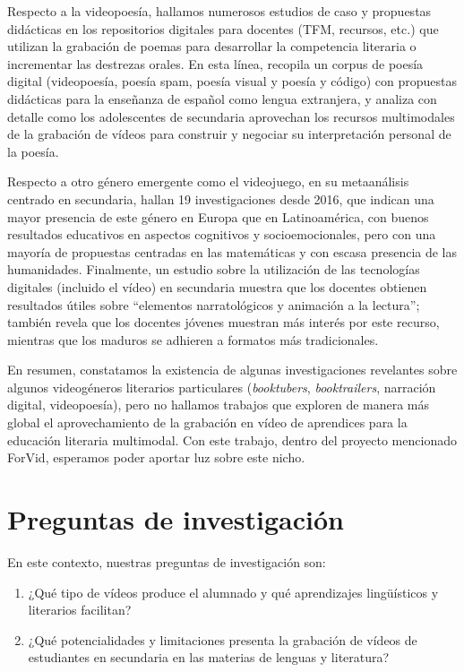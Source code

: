 \documentclass[spanish]{textolivre}
\begin{document}
Respecto a la videopoesía, hallamos numerosos estudios de caso y propuestas didácticas en los repositorios digitales para docentes (TFM, recursos, etc.) que utilizan la grabación de poemas para desarrollar la competencia literaria o incrementar las destrezas orales. En esta línea, \textcite{de_la_torre_literatura_2022} recopila un corpus de poesía digital (videopoesía, poesía spam, poesía visual y poesía y código) con propuestas didácticas para la enseñanza de español como lengua extranjera, y \textcite{hoglund_video_2017} analiza con detalle como los adolescentes de secundaria aprovechan los recursos multimodales de la grabación de vídeos para construir y negociar su interpretación personal de la poesía.

Respecto a otro género emergente como el videojuego, en su metaanálisis centrado en secundaria, \textcite{rojas-garcia_alisis_2022} hallan 19 investigaciones desde 2016, que indican una mayor presencia de este género en Europa que en Latinoamérica, con buenos resultados educativos en aspectos cognitivos y socioemocionales, pero con una mayoría de propuestas centradas en las matemáticas y con escasa presencia de las humanidades. Finalmente, un estudio sobre la utilización de las tecnologías digitales (incluido el vídeo) en secundaria \cite{rodriguez_munoz_competencia_2021} muestra que los docentes obtienen resultados útiles sobre “elementos narratológicos y animación a la lectura”; también revela que los docentes jóvenes muestran más interés por este recurso, mientras que los maduros se adhieren a formatos más tradicionales.

En resumen, constatamos la existencia de algunas investigaciones revelantes sobre algunos videogéneros literarios particulares (\textit{booktubers}, \textit{booktrailers}, narración digital, videopoesía), pero no hallamos trabajos que exploren de manera más global el aprovechamiento de la grabación en vídeo de aprendices para la educación literaria multimodal. Con este trabajo, dentro del proyecto mencionado ForVid, esperamos poder aportar luz sobre este nicho.

\section{Preguntas de investigación}\label{sec-conduta}
En este contexto, nuestras preguntas de investigación son:

\begin{enumerate}
 \item ¿Qué tipo de vídeos produce el alumnado y qué aprendizajes lingüísticos y literarios facilitan?
 \item ¿Qué potencialidades y limitaciones presenta la grabación de vídeos de estudiantes en secundaria en las materias de lenguas y literatura?
\end{enumerate}
\end{document}
